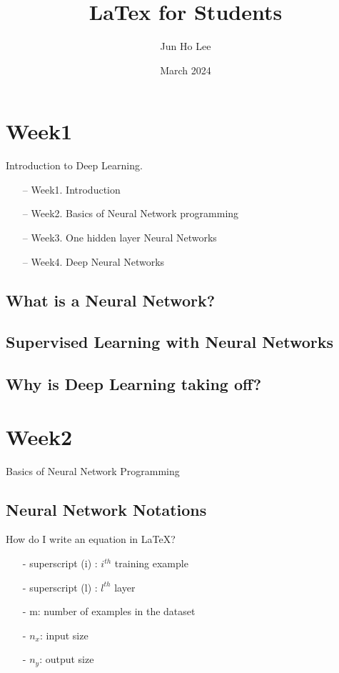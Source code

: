 \documentclass{article}
\title{LaTex for Students}
\author{Jun Ho Lee}
\date{March 2024}
\begin{document}
\newpage

\section{Week1}

Introduction to Deep Learning.

    \begin{itemize}
        \item[--]{Week1. Introduction}
        \item[--]{Week2. Basics of Neural Network programming}
        \item[--]{Week3. One hidden layer Neural Networks}
        \item[--]{Week4. Deep Neural Networks}
    \end{itemize}

\subsection{What is a Neural Network?}

\subsection{Supervised Learning with Neural Networks}

\subsection{Why is Deep Learning taking off?}

\newpage

\section{Week2}

Basics of Neural Network Programming

\subsection{Neural Network Notations}

How do I write an equation in \LaTeX?\\

\begin{itemize}
    \item[-]{superscript (i) : $i^{th}$ training example}
    \item[-]{superscript (l) : $l^{th}$ layer}
    \item[-]{m: number of examples in the dataset}
    \item[-]{$n_x$: input size}
    \item[-]{$n_y$: output size}
\end{itemize}
\end{document}
